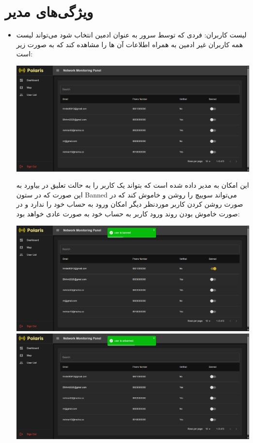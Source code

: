     \section{ویژگی‌های مدیر}
    \begin{itemize}
    	\item  لیست کاربران: فردی که توسط سرور به عنوان ادمین انتخاب شود می‌تواند لیست همه کاربران غیر ادمین به همراه اطلاعات آن ها را مشاهده کند که به صورت زیر است:
    		\begin{center}
    			\includegraphics[width=\textwidth]{images/fr-userlist.png}
    		\end{center}
    	این امکان به مدیر داده شده است که بتواند یک کاربر را به حالت تعلیق در بیاورد به این صورت که در ستون Banned می‌تواند سوییچ را روشن و خاموش کند که در صورت روشن کردن کاربر موردنظر دیگر امکان ورود به حساب خود را ندارد و در صورت خاموش بودن روند ورود کاربر به حساب خود به صورت عادی خواهد بود:
    		\begin{center}
    			\includegraphics[width=\textwidth]{images/fr-userlist-ban.png}
    			\includegraphics[width=\textwidth]{images/fr-userlist-unban.png}

\end{center}
\end{itemize}
